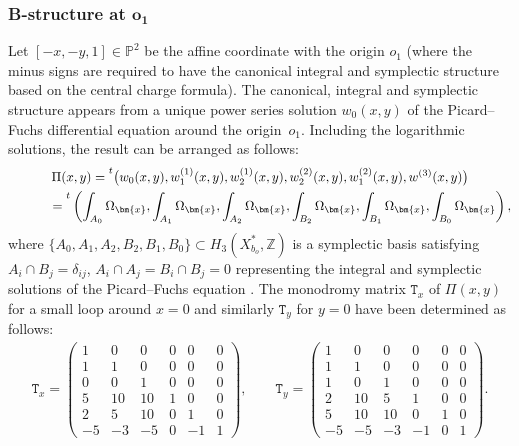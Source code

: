 \documentclass[10pt,a4paper]{amsart}
\numberwithin{equation}{section}
\begin{document}
\subsubsection[B-structure at $o_1$]{B-structure at $\boldsymbol{o_1}$} \label{para:B-str-1}
Let $[-x,-y,1]\in\mathbb{P}^{2}$ be the affine coordinate with the origin $o_{1}$ (where the minus signs are required to have the canonical integral and symplectic structure based on the central charge formula). The canonical, integral and symplectic structure appears from a unique power series solution $w_{0}(x,y)$ of the Picard--Fuchs differential equation around the origin~$o_{1}$. Including the logarithmic solutions, the result can be arranged as follows:
\begin{gather}
\Pi(x,y) ={\vphantom{\big(}}^{t}\big(w_{0}(x,y),w_{1}^{(1)}(x,y),
w_{2}^{(1)}(x,y),w_{2}^{(2)}(x,y),w_{1}^{(2)}(x,y),w^{(3)}(x,y)\big)\nonumber\\
\hphantom{\Pi(x,y)}{} = {\vphantom{\Big(}}^{t}
 \left(\int_{A_{0}}\Omega_{\bm{x}},\int_{A_{1}}\Omega_{\bm{x}},
 \int_{A_{2}}\Omega_{\bm{x}},\int_{B_{2}}\Omega_{\bm{x}},\int_{B_{1}}\Omega_{\bm{x}},
 \int_{B_{0}}\Omega_{\bm{x}}\right),\label{eq:PiX}
\end{gather}
where $\{ A_{0},A_{1},A_{2},B_{2},B_{1},B_{0}\} \subset H_{3}(X_{b_{o}}^{*},\mathbb{Z})$ is a symplectic basis satisfying $A_{i}\cap B_{j}=\delta_{ij}$, $A_{i}\cap A_{j}=B_{i}\cap B_{j}=0$ representing the integral and symplectic solutions of the Picard--Fuchs equation \cite[Section~6.3.1]{HTcmp}. The monodromy matrix $\mathtt{T}_{x}$ of $\Pi(x,y)$ for a small loop around $x=0$ and similarly $\mathtt{T}_{y}$ for $y=0$ have been determined as follows:
\begin{gather*}
\mathtt{T}_{x}=\left(\begin{smallmatrix}1 & 0 & 0 & 0 & 0 & 0\\
1 & 1 & 0 & 0 & 0 & 0\\
0 & 0 & 1 & 0 & 0 & 0\\
5 & 10 & 10 & 1 & 0 & 0\\
2 & 5 & 10 & 0 & 1 & 0\\
-5 & -3 & -5 & 0 & -1 & 1
\end{smallmatrix}\right),\qquad \mathtt{T}_{y}=\left(\begin{smallmatrix}1 & 0 & 0 & 0 & 0 & 0\\
1 & 1 & 0 & 0 & 0 & 0\\
1 & 0 & 1 & 0 & 0 & 0\\
2 & 10 & 5 & 1 & 0 & 0\\
5 & 10 & 10 & 0 & 1 & 0\\
-5 & -5 & -3 & -1 & 0 & 1
\end{smallmatrix}\right).
\end{gather*}
\end{document}
